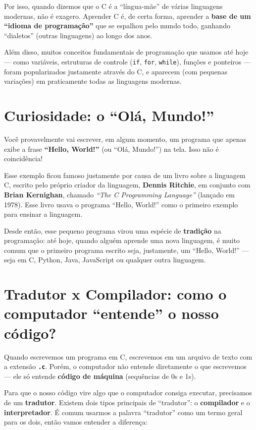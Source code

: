 Por isso, quando dizemos que o C é a ``língua-mãe'' de várias linguagens modernas, não é exagero. Aprender C é, de certa forma, aprender a \textbf{base de um ``idioma de programação''} que se espalhou pelo mundo todo, ganhando ``dialetos'' (outras linguagens) ao longo dos anos.

Além disso, muitos conceitos fundamentais de programação que usamos até hoje --- como variáveis, estruturas de controle (\texttt{if}, \texttt{for}, \texttt{while}), funções e ponteiros --- foram popularizados justamente através do C, e aparecem (com pequenas variações) em praticamente todas as linguagens modernas.

\section{\textcolor{azulPrincipal}{Curiosidade: o ``Olá, Mundo!''}}

Você provavelmente vai escrever, em algum momento, um programa que apenas exibe a frase \textbf{``Hello, World!''} (ou ``Olá, Mundo!'') na tela. Isso não é coincidência!

\begin{atencao}[Curiosidade]
Esse exemplo ficou famoso justamente por causa de um livro sobre a linguagem C, escrito pelo próprio criador da linguagem, \textbf{Dennis Ritchie}, em conjunto com \textbf{Brian Kernighan}, chamado \textit{``The C Programming Language''} (lançado em 1978). Esse livro usava o programa ``Hello, World!'' como o primeiro exemplo para ensinar a linguagem.
\end{atencao}

Desde então, esse pequeno programa virou uma espécie de \textbf{tradição} na programação: até hoje, quando alguém aprende uma nova linguagem, é muito comum que o primeiro programa escrito seja, justamente, um ``Hello, World!'' --- seja em C, Python, Java, JavaScript ou qualquer outra linguagem.

\section{\textcolor{azulPrincipal}{Tradutor x Compilador: como o computador ``entende'' o nosso código?}}

Quando escrevemos um programa em C, escrevemos em um arquivo de texto com a extensão \textbf{\texttt{.c}}. Porém, o computador não entende diretamente o que escrevemos --- ele só entende \textbf{código de máquina} (sequências de 0s e 1s).

Para que o nosso código vire algo que o computador consiga executar, precisamos de um \textbf{tradutor}. Existem dois tipos principais de ``tradutor'': o \textbf{compilador} e o \textbf{interpretador}. É comum usarmos a palavra ``tradutor'' como um termo geral para os dois, então vamos entender a diferença:

